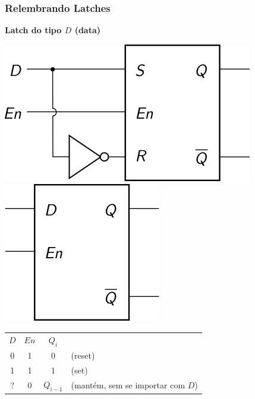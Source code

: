 \documentclass{beamer}
\begin{document}
\begin{frame}
\frametitle{Relembrando Latches}

\textbf{Latch do tipo $D$ (data)}

\begin{center}

\hspace*{\fill}
\includegraphics{images/latchD}%
\hspace*{\fill}%
\raisebox{40pt}{\Huge=}%
\hspace*{\fill}%
\includegraphics{images/latchD_blackbox}%
\hspace*{\fill}

\vspace{12pt}

\begin{tabular}{cc||cl}
$D$ & $En$ & $Q_i$  \\
\cline{1-3}
 0  &   1  &   0   & (reset) \\
 1  &   1  &   1   & (set) \\
 ?  &   0  & $Q_{i-1}$ & (mantém, sem se importar com $D$) \\
\end{tabular}
\end{center}

\end{frame}
\end{document}
